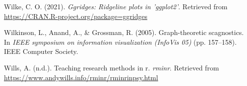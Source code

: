 \documentclass[
  english,
  doc,floatsintext]{apa6}
\newlength{\cslhangindent}
\newenvironment{CSLReferences}[2] %
 {%
  \setlength{\parindent}{0pt}
  \ifodd #1 \everypar{\setlength{\hangindent}{\cslhangindent}}\ignorespaces\fi
  \ifnum #2 > 0
  \setlength{\parskip}{#2\baselineskip}
  \fi
 }%
 {}
\begin{document}
\begin{CSLReferences}{1}{0}
\leavevmode{}%
Wilke, C. O. (2021). \emph{Ggridges: Ridgeline plots in 'ggplot2'}. Retrieved from \url{https://CRAN.R-project.org/package=ggridges}

\leavevmode{}%
Wilkinson, L., Anand, A., \& Grossman, R. (2005). Graph-theoretic scagnostics. In \emph{IEEE symposium on information visualization (InfoVis 05)} (pp. 157--158). IEEE Computer Society.

\leavevmode{}%
Wills, A. (n.d.). Teaching research methods in r. \emph{rminr}. Retrieved from \url{https://www.andywills.info/rminr/rminrinpsy.html}

\end{CSLReferences}

\endgroup
\end{document}
